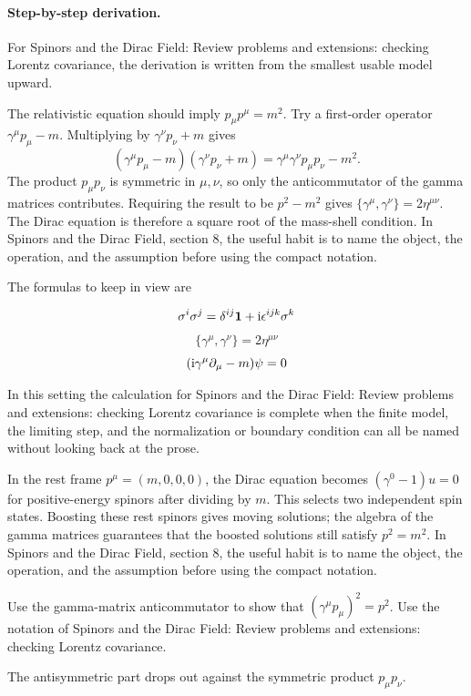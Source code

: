 \paragraph{Step-by-step derivation.}

For Spinors and the Dirac Field: Review problems and extensions: checking Lorentz covariance, the derivation is written from the smallest usable model upward.

The relativistic equation should imply \(p_\mu p^\mu=m^2\).  Try a first-order operator \(\gamma^\mu p_\mu-m\).  Multiplying by \(\gamma^\nu p_\nu+m\) gives
\[
  (\gamma^\mu p_\mu-m)(\gamma^\nu p_\nu+m)
  =
  \gamma^\mu\gamma^\nu p_\mu p_\nu-m^2.
\]
The product \(p_\mu p_\nu\) is symmetric in \(\mu,\nu\), so only the anticommutator of the gamma matrices contributes.  Requiring the result to be \(p^2-m^2\) gives \(\{\gamma^\mu,\gamma^\nu\}=2\eta^{\mu\nu}\).  The Dirac equation is therefore a square root of the mass-shell condition.  In Spinors and the Dirac Field, section 8, the useful habit is to name the object, the operation, and the assumption before using the compact notation.

The formulas to keep in view are

\[
  \sigma^i\sigma^j=\delta^{ij}\mathbf 1+\mathrm i\epsilon^{ijk}\sigma^k
\]
\[
  \{\gamma^\mu,\gamma^\nu\}=2\eta^{\mu\nu}
\]
\[
  (\mathrm i\gamma^\mu\partial_\mu-m)\psi=0
\]

In this setting the calculation for Spinors and the Dirac Field: Review problems and extensions: checking Lorentz covariance is complete when the finite model, the limiting step, and the normalization or boundary condition can all be named without looking back at the prose.




\begin{example}
In the rest frame \(p^\mu=(m,0,0,0)\), the Dirac equation becomes \((\gamma^0-1)u=0\) for positive-energy spinors after dividing by \(m\).  This selects two independent spin states.  Boosting these rest spinors gives moving solutions; the algebra of the gamma matrices guarantees that the boosted solutions still satisfy \(p^2=m^2\).  In Spinors and the Dirac Field, section 8, the useful habit is to name the object, the operation, and the assumption before using the compact notation.
\end{example}



\begin{exercise}
Use the gamma-matrix anticommutator to show that \((\gamma^\mu p_\mu)^2=p^2\).  Use the notation of Spinors and the Dirac Field: Review problems and extensions: checking Lorentz covariance.
\begin{answer}
The antisymmetric part drops out against the symmetric product \(p_\mu p_\nu\).
\end{answer}
\end{exercise}

